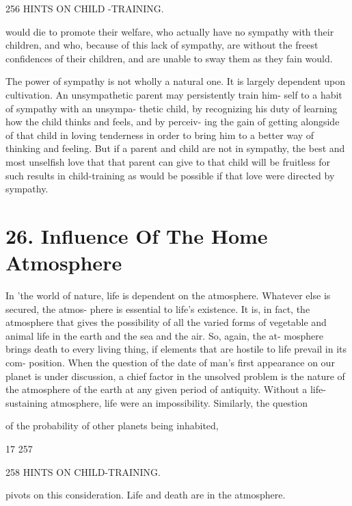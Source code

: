 \documentclass[
]{book}
\begin{document}
256 HINTS ON CHILD -TRAINING.

would die to promote their welfare, who actually have no sympathy with their children, and who, because of this lack of sympathy, are without the freest confidences of their children, and are unable to sway them as they fain would.

The power of sympathy is not wholly a natural one. It is largely dependent upon cultivation. An unsympathetic parent may persistently train him- self to a habit of sympathy with an unsympa- thetic child, by recognizing his duty of learning how the child thinks and feels, and by perceiv- ing the gain of getting alongside of that child in loving tenderness in order to bring him to a better way of thinking and feeling. But if a parent and child are not in sympathy, the best and most unselfish love that that parent can give to that child will be fruitless for such results in child-training as would be possible if that love were directed by sympathy.

\hypertarget{influence-of-the-home-atmosphere}{%
\chapter{26. Influence Of The Home Atmosphere}\label{influence-of-the-home-atmosphere}}

In 'the world of nature, life is dependent on the atmosphere. Whatever else is secured, the atmos- phere is essential to life's existence. It is, in fact, the atmosphere that gives the possibility of all the varied forms of vegetable and animal life in the earth and the sea and the air. So, again, the at- mosphere brings death to every living thing, if elements that are hostile to life prevail in its com- position. When the question of the date of man's first appearance on our planet is under discussion, a chief factor in the unsolved problem is the nature of the atmosphere of the earth at any given period of antiquity. Without a life-sustaining atmosphere, life were an impossibility. Similarly, the question

of the probability of other planets being inhabited,

17 257

258 HINTS ON CHILD-TRAINING.

pivots on this consideration. Life and death are in the atmosphere.
\end{document}
